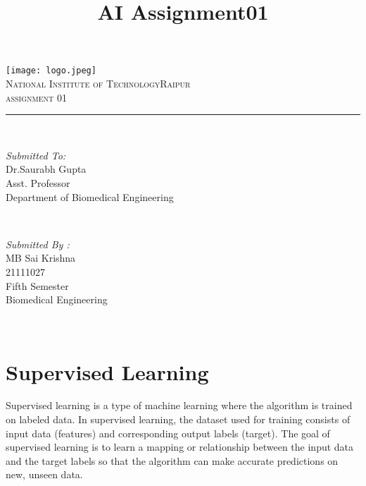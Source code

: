 \documentclass{article}
\title{AI Assignment01}
\begin{document}
\begin{titlepage}
	\centering
    \vspace*{0.5 cm}
    \texttt{[image: logo.jpeg]}\\[1.0 cm]	%
    \textsc{\LARGE  National Institute of Technology\newline\newline Raipur}\\[2.0 cm]	%
	\textsc{\Large assignment 01}\\[0.5 cm]				%
	\rule{\linewidth}{0.2 mm} \\[0.4 cm]

	
	\begin{minipage}{0.4\textwidth}
		\begin{flushleft} \large
			\emph{Submitted To:}\\
			Dr.Saurabh Gupta\\
            Asst. Professor\\
            Department of Biomedical Engineering\\
			\end{flushleft}
			\end{minipage}~
			\begin{minipage}{0.4\textwidth}
            
			\begin{flushright} \large
			\emph{Submitted By :} \\
			MB Sai Krishna\\
            21111027\\
        Fifth Semester\\
        Biomedical Engineering\\
		\end{flushright}
        
	\end{minipage}\\[2 cm]
	

\end{titlepage}

\maketitle

\section{Supervised Learning}
Supervised learning is a type of machine learning where the algorithm is trained on labeled data. In supervised learning, the dataset used for training consists of input data (features) and corresponding output labels (target). The goal of supervised learning is to learn a mapping or relationship between the input data and the target labels so that the algorithm can make accurate predictions on new, unseen data.
\end{document}
